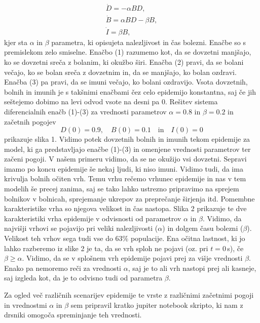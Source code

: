 \documentclass[slovene,11pt,a4paper]{article}
\begin{document}
\begin{align}
\dot{D} = -\alpha BD, \\
\dot{B} = \alpha BD - \beta B, \\
\dot{I} = \beta B,
\end{align}
kjer sta $\alpha$ in $\beta$ parametra, ki opisujeta nalezljivost in čas bolezni. Enačbe so s premislekom zelo smiselne. Enačbo (1) razumemo kot, da se dovzetni manjšajo, ko se dovzetni sreča z bolanim, ki okužbo širi. Enačba (2) pravi, da se bolani večajo, ko se bolan sreča z dovzetnim in, da se manjšajo, ko bolan ozdravi. Enačba (3) pa pravi, da se imuni večajo, ko bolani ozdravijo. Vsota dovzetnih, bolnih in imunih je s takšnimi enačbami čez celo epidemijo konstantna, saj če jih seštejemo dobimo na levi odvod vsote na desni pa 0. Rešitev sistema diferencialnih enačb (1)-(3) za vrednosti parametrov $\alpha = 0.8$ in $\beta = 0.2$ in začetnih pogojev
\[D(0) = 0.9, \quad B(0) = 0.1 \quad \text{in} \quad I(0) = 0 \]
prikazuje slika 1. Vidimo potek dovzetnih bolnih in imunih tekom epidemije za model, ki ga predstavljajo enačbe (1)-(3) in omenjene vrednosti parametrov ter začeni pogoji. V našem primeru vidimo, da se ne okužijo vsi dovzetni. Sepravi imamo po koncu epidemije še nekaj ljudi, ki niso imuni. Vidimo tudi, da ima krivulja bolnih očiten vrh. Temu vrhu rečemo vrhunec epidemije in nas v tem modelih še precej zanima, saj se tako lahko ustrezno pripravimo na sprejem bolnikov v bolnicah, sprejemanje ukrepov za preprečanje širjenja itd. Pomembne karakteristike vrha so njegova velikost in čas nastopa. Slika 2 prikazuje te dve karakteristiki vrha epidemije v odvisnosti od parametrov $\alpha$ in $\beta$. Vidimo, da najvišji vrhovi se pojavijo pri veliki nalezljivosti ($\alpha$) in dolgem času bolezni ($\beta$). Velikost teh vrhov sega tudi vse do $63\%$ populacije. Ena očitna lastnost, ki jo lahko razberemo iz slike 2 je ta, da se vrh sploh ne pojavi (oz. pri $t=0\,$s), če $\beta \geq \alpha$. Vidimo, da se v splošnem vrh epidemije pojavi prej za višje vrednosti $\beta$. Enako pa nemoremo reči za vrednosti $\alpha$, saj je to ali vrh nastopi prej ali kasneje, saj izgleda kot, da je to odvisno tudi od parametra $\beta$.

Za ogled več različnih scenarijev epidemije te vrste z različnimi začetnimi pogoji in vrednostmi $\alpha$ in $\beta$ sem pripravil kratko jupiter notebook skripto, ki nam z drsniki omogoča spreminjanje teh vrednosti.

\newpage
\end{document}
